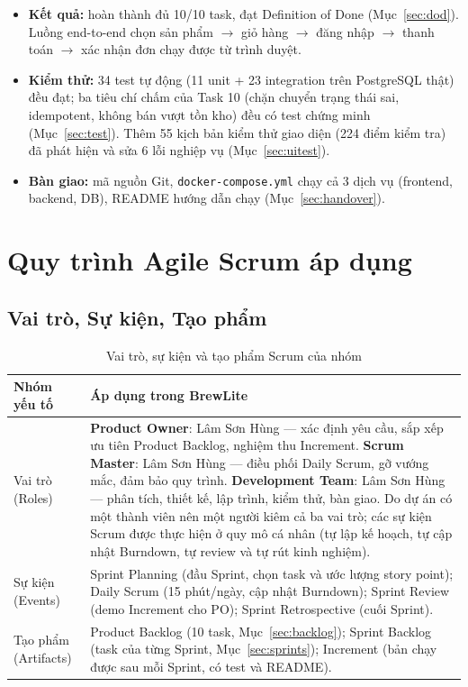 \documentclass[a4paper]{article}
\begin{document}
\begin{itemize}
  \item \textbf{Kết quả:} hoàn thành đủ 10/10 task, đạt Definition of Done (Mục~\ref{sec:dod}). Luồng end-to-end chọn sản phẩm $\to$ giỏ hàng $\to$ đăng nhập $\to$ thanh toán $\to$ xác nhận đơn chạy được từ trình duyệt.
  \item \textbf{Kiểm thử:} 34 test tự động (11 unit + 23 integration trên PostgreSQL thật) đều đạt; ba tiêu chí chấm của Task 10 (chặn chuyển trạng thái sai, idempotent, không bán vượt tồn kho) đều có test chứng minh (Mục~\ref{sec:test}). Thêm 55 kịch bản kiểm thử giao diện (224 điểm kiểm tra) đã phát hiện và sửa 6 lỗi nghiệp vụ (Mục~\ref{sec:uitest}).
  \item \textbf{Bàn giao:} mã nguồn Git, \texttt{docker-compose.yml} chạy cả 3 dịch vụ (frontend, backend, DB), README hướng dẫn chạy (Mục~\ref{sec:handover}).
\end{itemize}

\section{Quy trình Agile Scrum áp dụng}
\subsection{Vai trò, Sự kiện, Tạo phẩm}
\begin{table}[h!]
\centering
\begin{tabularx}{\textwidth}{|L{3.2cm}|X|}
\hline
\textbf{Nhóm yếu tố} & \textbf{Áp dụng trong BrewLite} \\ \hline
Vai trò (Roles) & \textbf{Product Owner}: Lâm Sơn Hùng --- xác định yêu cầu, sắp xếp ưu tiên Product Backlog, nghiệm thu Increment.\newline
\textbf{Scrum Master}: Lâm Sơn Hùng --- điều phối Daily Scrum, gỡ vướng mắc, đảm bảo quy trình.\newline
\textbf{Development Team}: Lâm Sơn Hùng --- phân tích, thiết kế, lập trình, kiểm thử, bàn giao. Do dự án có một thành viên nên một người kiêm cả ba vai trò; các sự kiện Scrum được thực hiện ở quy mô cá nhân (tự lập kế hoạch, tự cập nhật Burndown, tự review và tự rút kinh nghiệm). \\ \hline
Sự kiện (Events) & Sprint Planning (đầu Sprint, chọn task và ước lượng story point); Daily Scrum (15 phút/ngày, cập nhật Burndown); Sprint Review (demo Increment cho PO); Sprint Retrospective (cuối Sprint). \\ \hline
Tạo phẩm (Artifacts) & Product Backlog (10 task, Mục~\ref{sec:backlog}); Sprint Backlog (task của từng Sprint, Mục~\ref{sec:sprints}); Increment (bản chạy được sau mỗi Sprint, có test và README). \\ \hline
\end{tabularx}
\caption{Vai trò, sự kiện và tạo phẩm Scrum của nhóm}
\end{table}
\end{document}
